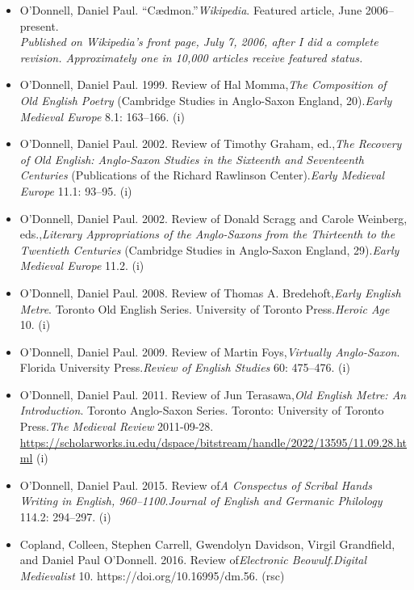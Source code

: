 \documentclass[12pt]{article}
\begin{document}
\begin{itemize}
  \item O'Donnell, Daniel Paul. “Cædmon.”\textit{Wikipedia}. Featured article, June 2006–present.\\
  \textit{Published on Wikipedia’s front page, July 7, 2006, after I did a complete revision. Approximately one in 10,000 articles receive featured status.}
  \item O'Donnell, Daniel Paul. 1999. Review of Hal Momma,\textit{The Composition of Old English Poetry} (Cambridge Studies in Anglo-Saxon England, 20).\textit{Early Medieval Europe} 8.1: 163–166. (i)
  \item O'Donnell, Daniel Paul. 2002. Review of Timothy Graham, ed.,\textit{The Recovery of Old English: Anglo-Saxon Studies in the Sixteenth and Seventeenth Centuries} (Publications of the Richard Rawlinson Center).\textit{Early Medieval Europe} 11.1: 93–95. (i)
  \item O'Donnell, Daniel Paul. 2002. Review of Donald Scragg and Carole Weinberg, eds.,\textit{Literary Appropriations of the Anglo-Saxons from the Thirteenth to the Twentieth Centuries} (Cambridge Studies in Anglo-Saxon England, 29).\textit{Early Medieval Europe} 11.2. (i)
  \item O'Donnell, Daniel Paul. 2008. Review of Thomas A. Bredehoft,\textit{Early English Metre}. Toronto Old English Series. University of Toronto Press.\textit{Heroic Age} 10. (i)
  \item O'Donnell, Daniel Paul. 2009. Review of Martin Foys,\textit{Virtually Anglo-Saxon}. Florida University Press.\textit{Review of English Studies} 60: 475–476. (i)
  \item O'Donnell, Daniel Paul. 2011. Review of Jun Terasawa,\textit{Old English Metre: An Introduction}. Toronto Anglo-Saxon Series. Toronto: University of Toronto Press.\textit{The Medieval Review} 2011-09-28. \url{https://scholarworks.iu.edu/dspace/bitstream/handle/2022/13595/11.09.28.html} (i)
  \item O'Donnell, Daniel Paul. 2015. Review of\textit{A Conspectus of Scribal Hands Writing in English, 960–1100}.\textit{Journal of English and Germanic Philology} 114.2: 294–297. (i)
  \item Copland, Colleen\*, Stephen Carrell\*, Gwendolyn Davidson\*, Virgil Grandfield\*, and Daniel Paul O'Donnell. 2016. Review of\textit{Electronic Beowulf}.\textit{Digital Medievalist} 10. https://doi.org/10.16995/dm.56. (rsc)
\end{itemize}
\end{document}
